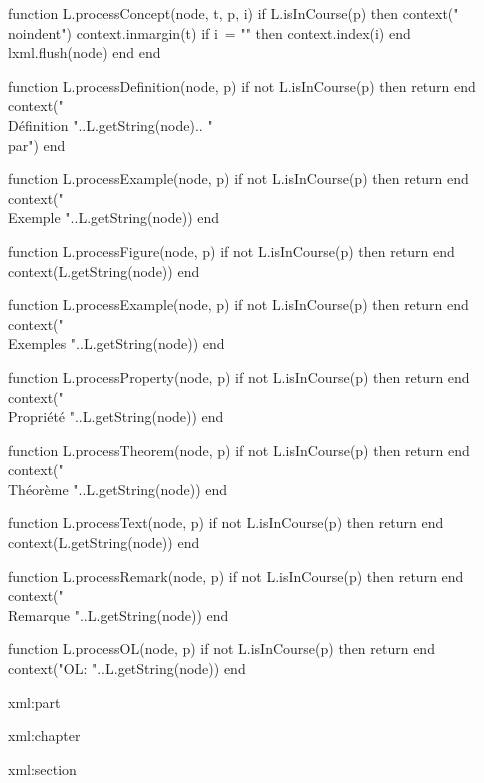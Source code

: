 function L.processConcept(node, t, p, i)
  if L.isInCourse(p) then 
    context("\\noindent")
    context.inmargin(t)
    if i~= "" then context.index(i) end
    lxml.flush(node)
  end
end

function L.processDefinition(node, p)
  if not L.isInCourse(p) then return end
  context("\\Définition "..L.getString(node).. "\\par")
end

function L.processExample(node, p)
  if not L.isInCourse(p) then return end
  context("\\Exemple "..L.getString(node))
end

function L.processFigure(node, p)
  if not L.isInCourse(p) then return end
  context(L.getString(node))
end

function L.processExample(node, p)
  if not L.isInCourse(p) then return end
  context("\\Exemples "..L.getString(node))
end

function L.processProperty(node, p)
  if not L.isInCourse(p) then return end
  context("\\Propriété "..L.getString(node))
end

function L.processTheorem(node, p)
  if not L.isInCourse(p) then return end
  context("\\Théorème "..L.getString(node))
end

function L.processText(node, p)
  if not L.isInCourse(p) then return end
  context(L.getString(node))
end

function L.processRemark(node, p)
  if not L.isInCourse(p) then return end
  context("\\Remarque "..L.getString(node))
end

function L.processOL(node, p)
  if not L.isInCourse(p) then return end
  context("OL: "..L.getString(node))
end
\stopluacode 



\startxmlsetups xml:part
\stopxmlsetups 

\def\isOfCourse#1{}

\def\getIndex#1{[[\xmlatt{#1}{i}]]}
\def\getProgram#1{[[\xmlatt{#1}{p}]]}
\def\getTitle#1{[[\xmlatt{#1}{t}]]}

\startxmlsetups xml:chapter
%
\stopxmlsetups

\startxmlsetups xml:section
%
\stopxmlsetups

